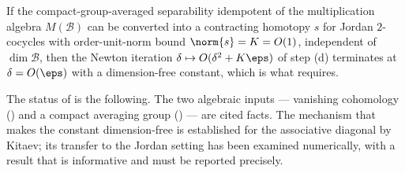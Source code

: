 \begin{openproblem}\label{prop:error-reduction}
 If the compact-group-averaged
separability idempotent of the multiplication algebra $M(\mathcal{B})$ can be
converted into a contracting homotopy $s$ for Jordan $2$-cocycles with
order-unit-norm bound $\norm{s}=K=O(1)$, independent of $\dim\mathcal{B}$, then
the Newton iteration $\delta\mapsto O(\delta^{2}+K\eps)$ of step (d) terminates
at $\delta=O(\eps)$ with a dimension-free constant, which is what
 requires.
\end{openproblem}

The status of  is the following. The two algebraic
inputs --- vanishing cohomology () and a compact averaging
group () --- are cited facts. The mechanism that makes
the constant dimension-free is established for the associative diagonal by
Kitaev; its transfer to the Jordan setting has been examined numerically, with a
result that is informative and must be reported precisely.

